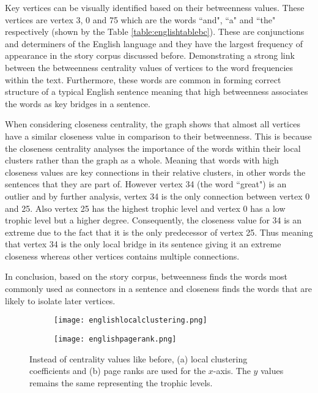 Key vertices can be visually identified based on their betweenness values. These vertices are vertex 3, 0 and 75 which are the words ``and", ``a" and ``the" respectively (shown by the Table \ref{table:englishtablebc}). These are conjunctions and determiners of the English language and they have the largest frequency of appearance in the story corpus discussed before. Demonstrating a strong link between the betweenness centrality values of vertices to the word frequencies within the text. Furthermore, these words are common in forming correct structure of a typical English sentence meaning that high betweenness associates the words as key bridges in a sentence. 

When considering closeness centrality, the graph shows that almost all vertices have a similar closeness value in comparison to their betweenness. This is because the closeness centrality analyses the importance of the words within their local clusters rather than the graph as a whole. Meaning that words with high closeness values are key connections in their relative clusters, in other words the sentences that they are part of. However vertex 34 (the word ``great") is an outlier and by further analysis, vertex 34 is the only connection between vertex 0 and 25. Also vertex 25 has the highest trophic level and vertex 0 has a low trophic level but a higher degree. Consequently, the closeness value for 34 is an extreme due to the fact that it is the only predecessor of vertex 25. Thus meaning that vertex 34 is the only local bridge in its sentence giving it an extreme closeness whereas other vertices contains multiple connections.

In conclusion, based on the story corpus, betweenness finds the words most commonly used as connectors in a sentence and closeness finds the words that are likely to isolate later vertices.

\begin{figure}[!htb]
\centering
\begin{subfigure}{.45\textwidth}
	\hspace{-1cm} 
	\texttt{[image: englishlocalclustering.png]}
	\caption{}
	\label{fig:englc}
\end{subfigure}
\hfill
\begin{subfigure}{.45\textwidth}
	\hspace{-1cm} 
	\texttt{[image: englishpagerank.png]}
	\caption{}
	\label{fig:engpr}
\end{subfigure}
\caption{Instead of centrality values like before, (a) local clustering coefficients and (b) page ranks are used for the $x$-axis. The $y$ values remains the same representing the trophic levels.}
\end{figure}

